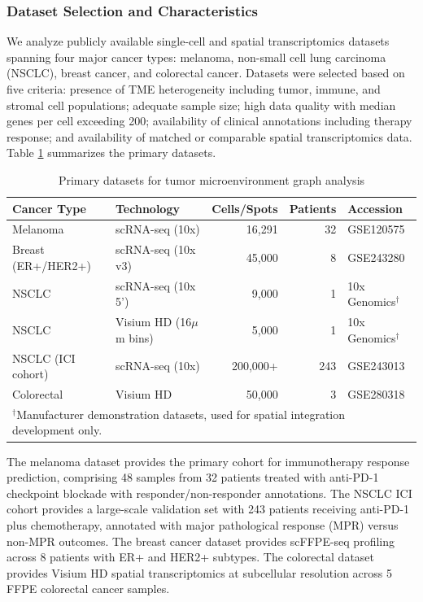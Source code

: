 \documentclass{article}
\begin{document}
\subsubsection{Dataset Selection and Characteristics}

We analyze publicly available single-cell and spatial transcriptomics datasets spanning four major cancer types: melanoma, non-small cell lung carcinoma (NSCLC), breast cancer, and colorectal cancer. Datasets were selected based on five criteria: presence of TME heterogeneity including tumor, immune, and stromal cell populations; adequate sample size; high data quality with median genes per cell exceeding 200; availability of clinical annotations including therapy response; and availability of matched or comparable spatial transcriptomics data. Table \ref{tab:datasets} summarizes the primary datasets.

\begin{table}[t]
\centering
\caption{Primary datasets for tumor microenvironment graph analysis}
\label{tab:datasets}
\begin{tabular}{llrrl}
\toprule
Cancer Type & Technology & Cells/Spots & Patients & Accession \\
\midrule
Melanoma & scRNA-seq (10x) & 16,291 & 32 & GSE120575 \\
Breast (ER+/HER2+) & scRNA-seq (10x v3) & 45,000 & 8 & GSE243280 \\
NSCLC & scRNA-seq (10x 5') & 9,000 & 1 & 10x Genomics$^\dagger$ \\
NSCLC & Visium HD (16$\mu$m bins) & 5,000 & 1 & 10x Genomics$^\dagger$ \\
NSCLC (ICI cohort) & scRNA-seq (10x) & 200,000+ & 243 & GSE243013 \\
Colorectal & Visium HD & 50,000 & 3 & GSE280318 \\
\bottomrule
\multicolumn{5}{l}{\footnotesize $^\dagger$Manufacturer demonstration datasets, used for spatial integration development only.}
\end{tabular}
\end{table}

The melanoma dataset \citep{sade2018defining} provides the primary cohort for immunotherapy response prediction, comprising 48 samples from 32 patients treated with anti-PD-1 checkpoint blockade with responder/non-responder annotations. The NSCLC ICI cohort \citep{deng2025nsclc} provides a large-scale validation set with 243 patients receiving anti-PD-1 plus chemotherapy, annotated with major pathological response (MPR) versus non-MPR outcomes. The breast cancer dataset \citep{janesick2023high} provides scFFPE-seq profiling across 8 patients with ER+ and HER2+ subtypes. The colorectal dataset \citep{oliveira2025colorectal} provides Visium HD spatial transcriptomics at subcellular resolution across 5 FFPE colorectal cancer samples.
\end{document}
